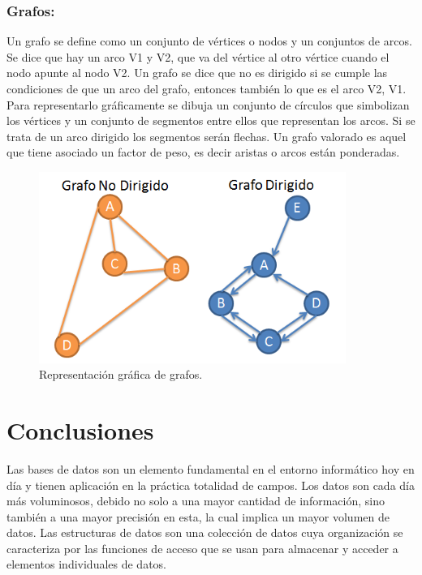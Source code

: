 \documentclass[12pt,letterpaper]{article}
\begin{document}
\subsubsection{Grafos:}
Un grafo se define como un conjunto de vértices o nodos y un conjuntos de arcos. Se dice que hay un arco V1 y V2, que va del vértice al otro vértice cuando el nodo apunte al nodo V2. Un grafo se dice que no es dirigido si se cumple las condiciones de que un arco del grafo, entonces también lo que es el arco V2, V1.\\Para representarlo gráficamente se dibuja un conjunto de cí­rculos que simbolizan los vértices y un conjunto de segmentos entre ellos que representan los arcos. Si se trata de un arco dirigido los segmentos serán flechas. Un grafo valorado es aquel que tiene asociado un factor de peso, es decir aristas o arcos están ponderadas.
\vspace*{-0.1in}
\begin{figure}[h]
\begin{center}
\includegraphics[width=10cm]{./Imagenes/grafo.png}
\caption{Representación gráfica de grafos.}
\label{rg6}
\end{center}
\end{figure}
\vspace*{-0.4in}

\section{Conclusiones}
Las bases de datos son un elemento fundamental en el entorno informático hoy en dí­a y tienen aplicación en la práctica totalidad de campos. Los datos son cada dí­a más voluminosos, debido no solo a una mayor cantidad de información, sino también a una mayor precisión en esta, la cual implica un mayor volumen de datos.
Las estructuras de datos son una colección de datos cuya organización se caracteriza por las funciones de acceso que se usan para almacenar y acceder a elementos individuales de datos. 
\end{document}
